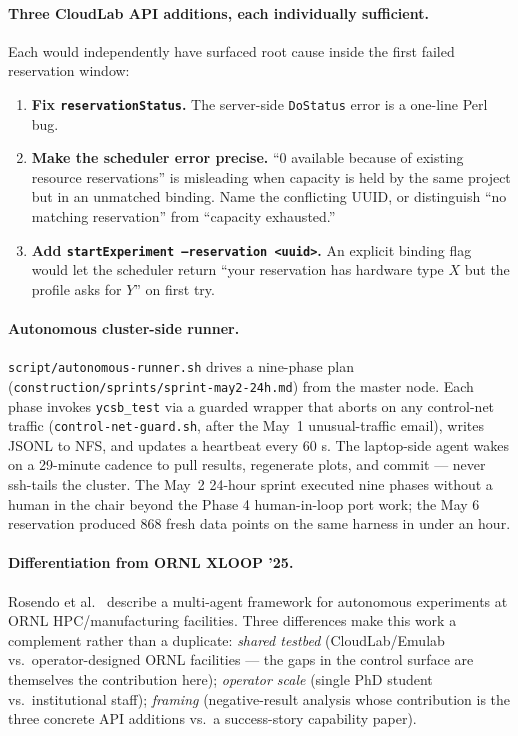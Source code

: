 \documentclass[11pt,a4paper]{article}
\begin{document}
\paragraph{Three CloudLab API additions, each individually sufficient.}
\label{api-additions:approach}
Each would independently have surfaced root cause inside the first failed reservation window:
\begin{enumerate}[nosep,leftmargin=*]
    \item \textbf{Fix \texttt{reservationStatus}.} The server-side \texttt{DoStatus} error is a one-line Perl bug.
    \item \textbf{Make the scheduler error precise.} ``0 available because of existing resource reservations'' is misleading when capacity is held by the same project but in an unmatched binding. Name the conflicting UUID, or distinguish ``no matching reservation'' from ``capacity exhausted.''
    \item \textbf{Add \texttt{startExperiment --reservation <uuid>}.} An explicit binding flag would let the scheduler return ``your reservation has hardware type $X$ but the profile asks for $Y$'' on first try.
\end{enumerate}

\paragraph{Autonomous cluster-side runner.} \texttt{script/autonomous-runner.sh} drives a nine-phase plan (\texttt{construction/sprints/sprint-may2-24h.md}) from the master node. Each phase invokes \texttt{ycsb\_test} via a guarded wrapper that aborts on any control-net traffic (\texttt{control-net-guard.sh}, after the May~1 unusual-traffic email), writes JSONL to NFS, and updates a heartbeat every 60 s. The laptop-side agent wakes on a 29-minute cadence to pull results, regenerate plots, and commit --- never ssh-tails the cluster. The May~2 24-hour sprint executed nine phases without a human in the chair beyond the Phase 4 human-in-loop port work; the May 6 reservation produced 868 fresh data points on the same harness in under an hour.

\paragraph{Differentiation from ORNL XLOOP '25.} Rosendo et al.~\cite{ornl-agents-xloop25} describe a multi-agent framework for autonomous experiments at ORNL HPC/manufacturing facilities. Three differences make this work a complement rather than a duplicate: \emph{shared testbed} (CloudLab/Emulab vs.\ operator-designed ORNL facilities --- the gaps in the control surface are themselves the contribution here); \emph{operator scale} (single PhD student vs.\ institutional staff); \emph{framing} (negative-result analysis whose contribution is the three concrete API additions vs.\ a success-story capability paper).
\end{document}
